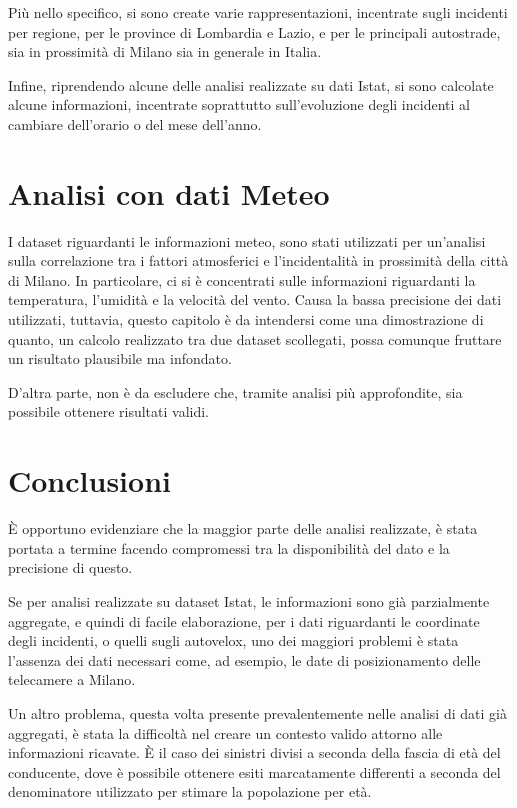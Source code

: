 \documentclass[a4paper]{article}
\begin{document}
Più nello specifico, si sono create varie rappresentazioni, incentrate sugli incidenti 
per regione, per le province di Lombardia e Lazio, e per le principali autostrade, sia in 
prossimità di Milano sia in generale in Italia.

Infine, riprendendo alcune delle analisi realizzate su dati Istat, si sono calcolate alcune 
informazioni, incentrate soprattutto sull'evoluzione degli incidenti al cambiare dell'orario 
o del mese dell'anno.

\section{Analisi con dati Meteo}

I dataset riguardanti le informazioni meteo, sono stati utilizzati per un'analisi sulla 
correlazione tra i fattori atmosferici e l'incidentalità in 
prossimità della città di Milano. 
In particolare, ci si è concentrati sulle informazioni riguardanti la temperatura, 
l'umidità e la velocità del vento. 
Causa la bassa precisione dei dati utilizzati, tuttavia, questo capitolo è 
da intendersi come una dimostrazione di quanto, un calcolo realizzato tra due dataset 
scollegati, possa comunque fruttare un risultato plausibile ma infondato. 

D'altra parte, non è da escludere che, tramite analisi più approfondite, 
sia possibile ottenere risultati validi.

\section{Conclusioni}

\`E opportuno evidenziare che la maggior parte delle analisi realizzate, 
è stata portata a termine facendo compromessi tra la disponibilità del dato e la 
precisione di questo. 

Se per analisi realizzate su dataset Istat, le informazioni sono già parzialmente aggregate, 
e quindi di facile elaborazione, per i dati riguardanti le coordinate degli incidenti, 
o quelli sugli autovelox, uno dei maggiori problemi è stata l'assenza dei dati necessari come, 
ad esempio, le date di posizionamento delle telecamere a Milano. 

Un altro problema, questa volta presente prevalentemente nelle analisi di dati già aggregati, 
è stata la difficoltà nel creare un contesto valido attorno alle informazioni ricavate. 
\`E il caso dei sinistri divisi a seconda della fascia di età del conducente, dove è possibile 
ottenere esiti marcatamente differenti a seconda del denominatore utilizzato per 
stimare la popolazione per età.

\printbibliography

\raggedleft\vfill{}\par
\end{document}
